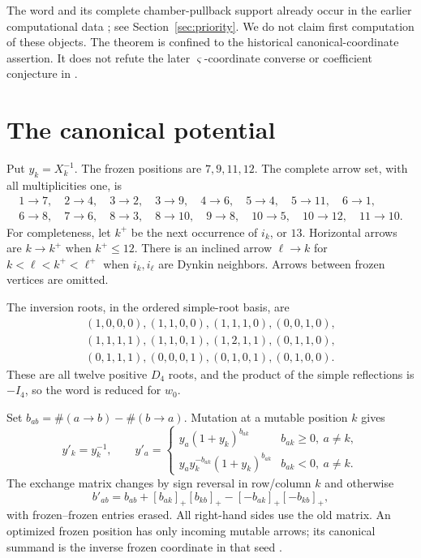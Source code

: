 \documentclass[11pt]{article}
\begin{document}
The word and its complete chamber-pullback support already occur in the
earlier computational data \cite[Case~267]{DATA}; see Section~\ref{sec:priority}.
We do not claim first computation of these objects. The theorem is confined
to the historical canonical-coordinate assertion. It does not refute the
later $\varsigma$-coordinate converse or coefficient conjecture in
\cite{KS}.

\section{The canonical potential}
Put $y_k=X_k^{-1}$. The frozen positions are $7,9,11,12$. The complete arrow
set, with all multiplicities one, is
\[
\begin{gathered}
 1\to7,\quad2\to4,\quad3\to2,\quad3\to9,\quad4\to6,\quad5\to4,\quad5\to11,\quad6\to1,\\
 6\to8,\quad7\to6,\quad8\to3,\quad8\to10,\quad9\to8,\quad10\to5,\quad10\to12,\quad11\to10.
\end{gathered}
\]
For completeness, let $k^+$ be the next occurrence of $i_k$, or $13$.
Horizontal arrows are $k\to k^+$ when $k^+\le12$. There is an inclined
arrow $\ell\to k$ for $k<\ell<k^+<\ell^+$ when $i_k,i_\ell$ are Dynkin
neighbors. Arrows between frozen vertices are omitted.

The inversion roots, in the ordered simple-root basis, are
\[
\begin{gathered}
(1,0,0,0),(1,1,0,0),(1,1,1,0),(0,0,1,0),\\
(1,1,1,1),(1,1,0,1),(1,2,1,1),(0,1,1,0),\\
(0,1,1,1),(0,0,0,1),(0,1,0,1),(0,1,0,0).
\end{gathered}
\]
These are all twelve positive $D_4$ roots, and the product of the simple
reflections is $-I_4$, so the word is reduced for $w_0$.

Set $b_{ab}=\#(a\to b)-\#(b\to a)$. Mutation at a mutable position $k$ gives
\begin{equation}\label{eq:mutation}
 y'_k=y_k^{-1},\qquad
 y'_a=\begin{cases}
 y_a(1+y_k)^{b_{ak}}&b_{ak}\ge0,\ a\ne k,\\
 y_a y_k^{-b_{ak}}(1+y_k)^{b_{ak}}&b_{ak}<0,\ a\ne k.
 \end{cases}
\end{equation}
The exchange matrix changes by sign reversal in row/column $k$ and otherwise
\[
 b'_{ab}=b_{ab}+[b_{ak}]_+[b_{kb}]_+-[-b_{ak}]_+[-b_{kb}]_+,
\]
with frozen--frozen entries erased. All right-hand sides use the old matrix.
An optimized frozen position has only incoming mutable arrows; its canonical
summand is the inverse frozen coordinate in that seed \cite[Def.~7]{KS}.
\end{document}
